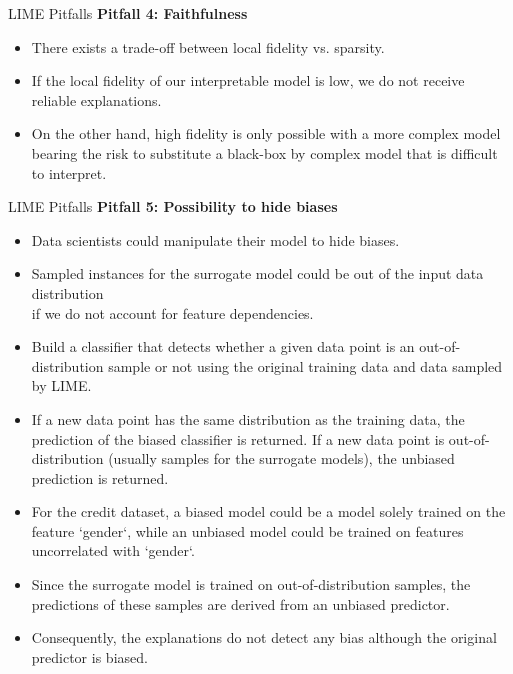 \documentclass[aspectratio=169]{../latex_main/tntbeamer}  %
\begin{document}
\begin{frame}[c]{LIME Pitfalls }
\textbf{Pitfall 4: Faithfulness}
\begin{itemize}
	\item There exists a trade-off between local fidelity vs. sparsity. 
	\item If the local fidelity of our interpretable model is low, we do not receive reliable explanations.
	\item On the other hand, high fidelity is only possible with a more complex model bearing the risk to substitute a black-box by complex model that is difficult to interpret.
\end{itemize}

\end{frame}
\begin{frame}{LIME Pitfalls }
\vspace{-1em}
\textbf{Pitfall 5: Possibility to hide biases}
\begin{itemize}
	\item Data scientists could manipulate their model to hide biases. 
	\item Sampled instances for the surrogate model could be out of the input data distribution\\ if we do not account for feature dependencies. 
	\pause
	\item Build a classifier that detects whether a given data point is an out-of-distribution sample or not using the original training data and data sampled by LIME. 
	\item If a new data point has the same distribution as the training data, the prediction of the biased classifier is returned. If a new data point is out-of-distribution (usually samples for the surrogate models), the unbiased prediction is returned.
	\pause
	\item For the credit dataset, a biased model could be a model solely trained on the feature `gender`, while an unbiased model could be trained on features uncorrelated with `gender`.
	\item Since the surrogate model is trained on out-of-distribution samples, the predictions of these samples are derived from an unbiased predictor. 
	\item Consequently, the explanations do not detect any bias although the original predictor is biased. 
\end{itemize}
\end{frame}
\end{document}
